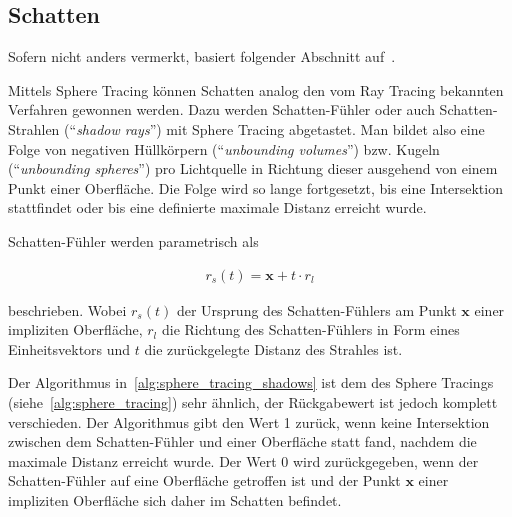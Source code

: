 \subsection{Schatten}
\label{sec:rendering_implicit_surfaces_shadows}

Sofern nicht anders vermerkt, basiert folgender Abschnitt
auf~\cite[S. 7]{reiner_smi_2011}.

Mittels Sphere Tracing können Schatten analog den vom Ray Tracing
bekannten Verfahren gewonnen werden. Dazu werden Schatten-Fühler oder
auch Schatten-Strahlen (``\textit{shadow rays}'') mit Sphere Tracing
abgetastet.  Man bildet also eine Folge von negativen Hüllkörpern
(``\textit{unbounding volumes}'') bzw. Kugeln (``\textit{unbounding
    spheres}'') pro Lichtquelle in Richtung dieser ausgehend von einem
Punkt einer Oberfläche. Die Folge wird so lange fortgesetzt, bis eine
Intersektion stattfindet oder bis eine definierte maximale Distanz
erreicht wurde.

Schatten-Fühler werden parametrisch als

\begin{gather}
    r_{s}(t) = \bm{x} + t \cdot r_{l}
\end{gather}

beschrieben. Wobei $r_{s}(t)$ der Ursprung des Schatten-Fühlers am Punkt $\bm{x}$
einer impliziten Oberfläche, $r_{l}$ die Richtung des Schatten-Fühlers
in Form eines Einheitsvektors und $t$ die zurückgelegte Distanz des
Strahles ist.

Der Algorithmus in~\autoref{alg:sphere_tracing_shadows} ist dem des
Sphere Tracings (siehe~\autoref{alg:sphere_tracing}) sehr ähnlich, der
Rückgabewert ist jedoch komplett verschieden. Der Algorithmus gibt den
Wert 1 zurück, wenn keine Intersektion zwischen dem Schatten-Fühler und
einer Oberfläche statt fand, nachdem die maximale Distanz erreicht
wurde. Der Wert 0 wird zurückgegeben, wenn der Schatten-Fühler auf eine
Oberfläche getroffen ist und der Punkt $\bm{x}$ einer impliziten
Oberfläche sich daher im Schatten befindet.


